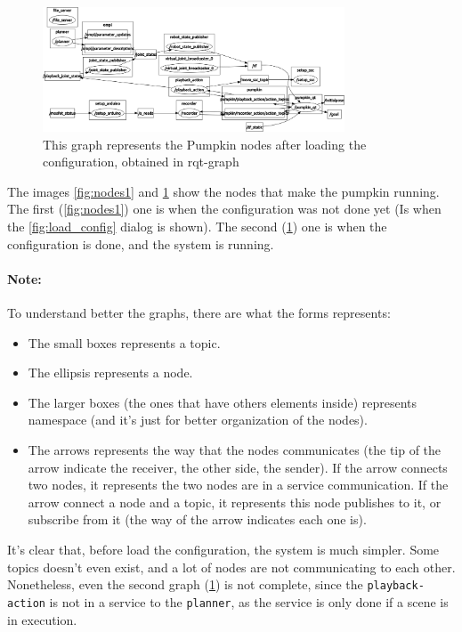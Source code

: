 \documentclass[oneside,a4paper,titlepage]{article}
\begin{document}
\begin{figure}[ht!]
	\centering
	\includegraphics[width=0.8\textwidth]{graph2}
	\caption[Pumpkin Nodes 2]{This graph represents the Pumpkin nodes after loading the configuration, obtained in rqt-graph}
	\label{fig:nodes2}
\end{figure}

The images \ref{fig:nodes1} and \ref{fig:nodes2} show the nodes that make the pumpkin running. The first (\ref{fig:nodes1}) one is when the configuration was not done yet (Is when the \ref{fig:load_config} dialog is shown). The second (\ref{fig:nodes2}) one is when the configuration is done, and the system is running.

\paragraph{Note: } To understand better the graphs, there are what the forms represents:

\begin{itemize}
	\item The small boxes represents a topic.
	\item The ellipsis represents a node.
	\item The larger boxes (the ones that have others elements inside) represents namespace (and it's just for better organization of the nodes).
	\item The arrows represents the way that the nodes communicates (the tip of the arrow indicate the receiver, the other side, the sender). If the arrow connects two nodes, it represents the two nodes are in a service communication. If the arrow connect a node and a topic, it represents this node publishes to it, or subscribe from it (the way of the arrow indicates each one is).
\end{itemize}

It's clear that, before load the configuration, the system is much simpler. Some topics doesn't even exist, and a lot of nodes are not communicating to each other. Nonetheless, even the second graph (\ref{fig:nodes2}) is not complete, since the \texttt{playback-action} is not in a service to the \texttt{planner}, as the service is only done if a scene is in execution.
\end{document}
